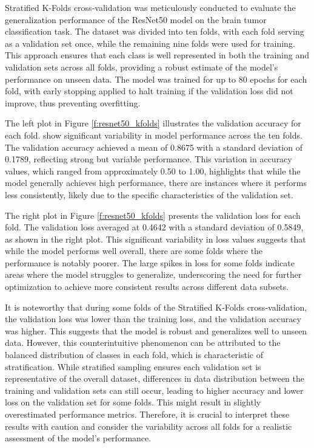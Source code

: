 Stratified K-Folds cross-validation was meticulously conducted to evaluate the generalization performance of the ResNet50 model on the brain tumor classification task. The dataset was divided into ten folds, with each fold serving as a validation set once, while the remaining nine folds were used for training. This approach ensures that each class is well represented in both the training and validation sets across all folds, providing a robust estimate of the model's performance on unseen data. The model was trained for up to 80 epochs for each fold, with early stopping applied to halt training if the validation loss did not improve, thus preventing overfitting.

The left plot in Figure \ref{f:resnet50_kfolds} illustrates the validation accuracy for each fold. show significant variability in model performance across the ten folds. The validation accuracy achieved a mean of 0.8675 with a standard deviation of 0.1789, reflecting strong but variable performance. This variation in accuracy values, which ranged from approximately 0.50 to 1.00, highlights that while the model generally achieves high performance, there are instances where it performs less consistently, likely due to the specific characteristics of the validation set.

The right plot in Figure \ref{f:resnet50_kfolds} presents the validation loss for each fold. The validation loss averaged at 0.4642 with a standard deviation of 0.5849, as shown in the right plot. This significant variability in loss values suggests that while the model performs well overall, there are some folds where the performance is notably poorer. The large spikes in loss for some folds indicate areas where the model struggles to generalize, underscoring the need for further optimization to achieve more consistent results across different data subsets.

It is noteworthy that during some folds of the Stratified K-Folds cross-validation, the validation loss was lower than the training loss, and the validation accuracy was higher. This suggests that the model is robust and generalizes well to unseen data. However, this counterintuitive phenomenon can be attributed to the balanced distribution of classes in each fold, which is characteristic of stratification. While stratified sampling ensures each validation set is representative of the overall dataset, differences in data distribution between the training and validation sets can still occur, leading to higher accuracy and lower loss on the validation set for some folds. This might result in slightly overestimated performance metrics. Therefore, it is crucial to interpret these results with caution and consider the variability across all folds for a realistic assessment of the model's performance.

